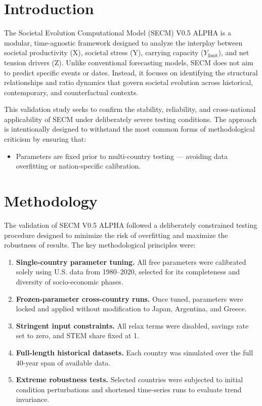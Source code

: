 \documentclass[12pt,a4paper]{article}
\begin{document}
\section{Introduction}
The Societal Evolution Computational Model (SECM) V0.5 ALPHA is a modular, time-agnostic framework designed to analyze the interplay between societal productivity (X), societal stress (Y), carrying capacity ($Y_{\text{limit}}$), and net tension drivers (Z). Unlike conventional forecasting models, SECM does not aim to predict specific events or dates. Instead, it focuses on identifying the structural relationships and ratio dynamics that govern societal evolution across historical, contemporary, and counterfactual contexts.

This validation study seeks to confirm the stability, reliability, and cross-national applicability of SECM under deliberately severe testing conditions. The approach is intentionally designed to withstand the most common forms of methodological criticism by ensuring that:
\begin{itemize}
    \item Parameters are fixed prior to multi-country testing --- avoiding data overfitting or nation-specific calibration.
\end{itemize}
\section{Methodology}
The validation of SECM V0.5 ALPHA followed a deliberately constrained testing procedure designed to minimize the risk of overfitting and maximize the robustness of results. The key methodological principles were:

\begin{enumerate}
    \item \textbf{Single-country parameter tuning.} All free parameters were calibrated solely using U.S. data from 1980–2020, selected for its completeness and diversity of socio-economic phases.
    \item \textbf{Frozen-parameter cross-country runs.} Once tuned, parameters were locked and applied without modification to Japan, Argentina, and Greece.
    \item \textbf{Stringent input constraints.} All relax terms were disabled, savings rate set to zero, and STEM share fixed at 1.
    \item \textbf{Full-length historical datasets.} Each country was simulated over the full 40-year span of available data.
    \item \textbf{Extreme robustness tests.} Selected countries were subjected to initial condition perturbations and shortened time-series runs to evaluate trend invariance.
\end{enumerate}
\end{document}
